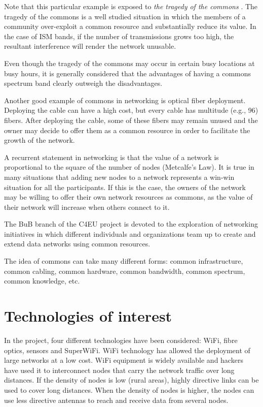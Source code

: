 \documentclass[conference]{IEEEtran}
\begin{document}
Note that this particular example is exposed to \emph{the tragedy of the commons} \cite{hardin1968tc,feeny1990tct}.
The tragedy of the commons is a well studied situation in which the members of a community over-exploit a common resource and substantially reduce its value.
In the case of ISM bands, if the number of transmissions grows too high, the resultant interference will render the network unusable.

Even though the tragedy of the commons may occur in certain busy locations at busy hours, it is generally considered that the advantages of having a commons spectrum band clearly outweigh the disadvantages.

Another good example of commons in networking is optical fiber deployment.
Deploying the cable can have a high cost, but every cable has multitude (e.g., 96) fibers.
After deploying the cable, some of these fibers may remain unused and the owner may decide to offer them as a common resource in order to facilitate the growth of the network.

A recurrent statement in networking is that the value of a network is proportional to the square of the number of nodes (Metcalfe's Law).
It is true in many situations that adding new nodes to a network represents a win-win situation for all the participants.
If this is the case, the owners of the network may be willing to offer their own network resources as commons, as the value of their network will increase when others connect to it.

The BuB branch of the C4EU project is devoted to the exploration of networking initiatives in which different individuals and organizations team up to create and extend data networks using common resources.

The idea of commons can take many different forms: common infrastructure, common cabling, common hardware, common bandwidth, common spectrum, common knowledge, etc.

\section{Technologies of interest}
\label{sec:technologies}

In the project, four different technologies have been considered: WiFi, fibre optics, sensors and SuperWiFi.
WiFi technology has allowed the deployment of large networks at a low cost.
WiFi equipment is widely available and hackers have used it to interconnect nodes that carry the network traffic over long distances.
If the density of nodes is low (rural areas), highly directive links can be used to cover long distances.
When the density of nodes is higher, the nodes can use less directive antennas to reach and receive data from several nodes.
\end{document}
